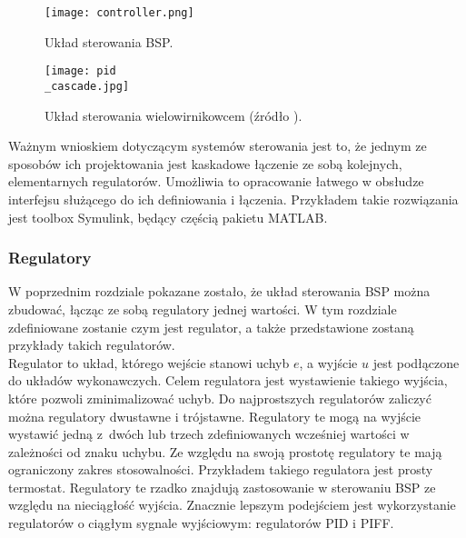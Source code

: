 \begin{figure}[!h]
   	\centering
      	\texttt{[image: controller.png]}
      	\caption{Układ sterowania BSP.}
      	\label{control_3_stage}
\end{figure}

\begin{figure}[!h]
   	\centering
      	\texttt{[image: pid\\\_cascade.jpg]}
      	\caption{Układ sterowania wielowirnikowcem (źródło \cite{energies}).}
      	\label{pid_ladder}
\end{figure}

Ważnym wnioskiem dotyczącym systemów sterowania jest to, że jednym ze sposobów ich projektowania jest kaskadowe łączenie ze sobą kolejnych, elementarnych regulatorów. Umożliwia to opracowanie łatwego w obsłudze interfejsu służącego do ich definiowania i łączenia. Przykładem takie rozwiązania jest toolbox Symulink, będący częścią pakietu MATLAB.

\subsubsection{Regulatory}

W poprzednim rozdziale pokazane zostało, że układ sterowania BSP można zbudować, łącząc ze sobą regulatory jednej wartości. W tym rozdziale zdefiniowane zostanie czym jest regulator, a także przedstawione zostaną przykłady takich regulatorów.\\

Regulator to układ, którego wejście stanowi uchyb $e$, a wyjście $u$ jest podłączone do układów wykonawczych. Celem regulatora jest wystawienie takiego wyjścia, które pozwoli zminimalizować uchyb. Do najprostszych regulatorów zaliczyć można regulatory dwustawne i trójstawne. Regulatory te mogą na wyjście wystawić jedną z~dwóch lub trzech zdefiniowanych wcześniej wartości w zależności od znaku uchybu. Ze względu na swoją prostotę regulatory te mają ograniczony zakres stosowalności. Przykładem takiego regulatora jest prosty termostat. Regulatory te rzadko znajdują zastosowanie w sterowaniu BSP ze względu na nieciągłość wyjścia. Znacznie lepszym podejściem jest wykorzystanie regulatorów o ciągłym sygnale wyjściowym: regulatorów PID i PIFF.\\

